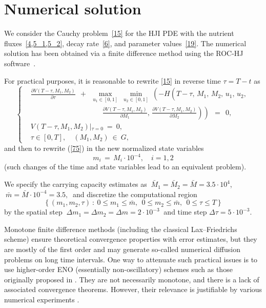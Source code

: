 \documentclass[11pt]{amsart}
\begin{document}
\section{Numerical solution}

We consider the Cauchy problem~\cref{15} for the HJI PDE with the nutrient
fluxes~\cref{4,5_1,5_2}, decay rate~\cref{6}, and parameter values~\cref{19}.
The numerical solution has been obtained via a finite difference method
\cite{FlemingSoner2006,
      OsherShu1991,
      BotkinHoffmannTurova2011,
      BokanForcadelZidani2010}
using the ROC-HJ software~\cite{ROCHJ2019}.

For practical purposes, it is reasonable to rewrite \cref{15} in reverse
time $ \tau = T - t $ as
\begin{equation}
\left\{ \begin{aligned}
& \frac{\partial V(T - \tau, M_1, M_2)}{\partial \tau} \:\: + \:\:
\max_{u_1 \in [0, 1]} \: \min_{u_2 \in [0, 1]} \:
\left( -H \left( T - \tau, \, M_1, \, M_2, \, u_1, \, u_2, 
{}^{{}^{{}^{{}^{{}^{}}}}} \right. \right. \\
& \qquad\qquad\qquad\qquad\qquad
\left. \left. \frac{\partial V(T - \tau, M_1, M_2)}{\partial M_1}, \,
\frac{\partial V(T - \tau, M_1, M_2)}{\partial M_2} \right) \right) \:\: =
\:\: 0, \\
& V(T - \tau, M_1, M_2) \left|_{\tau = 0} \right. \: = \: 0, \\
& \tau \in [0, T], \quad (M_1, M_2) \: \in \: G,
\end{aligned} \right.  \label{75}
\end{equation}
and then to rewrite (\ref{75}) in the new normalized state variables
\begin{equation}
m_i \, = \, M_i \cdot 10^{-4}, \quad i = 1,2  \label{75_1}
\end{equation}
(such changes of the time and state variables lead to an equivalent problem).

We specify the carrying capacity estimates as $ \: \bar{M}_1 = \bar{M}_2 =
\bar{M} = 3.5 \cdot 10^4 $,
$ \: \bar{m} = \bar{M} \cdot 10^{-4} = 3.5, \: $ and discretize the
computational region
$$
\left\{ (m_1, m_2, \tau) \: \colon \: 0 \leqslant m_1 \leqslant \bar{m}, \:\: 0
\leqslant m_2 \leqslant \bar{m}, \:\:
0 \leqslant \tau \leqslant T \right\}
$$
by the spatial step $ \: \Delta m_1 = \Delta m_2 = \Delta m = 2 \cdot 10^{-3}
\: $ and time step $ \Delta \tau = 5 \cdot 10^{-3} $.

Monotone finite difference methods (including the classical Lax--Friedrichs
scheme) ensure theoretical convergence properties with error estimates, but
they are mostly of the first order and may generate so-called numerical
diffusion problems on long time intervals. One way to attenuate such practical
issues is to use higher-order ENO (essentially non-oscillatory) schemes such
as those originally proposed in \cite{OsherShu1991}. They are not necessarily
monotone, and there is a lack of associated convergence theorems. However,
their relevance is justifiable by various numerical experiments 
\cite{OsherShu1991,BokanForcadelZidani2010}.
\end{document}
